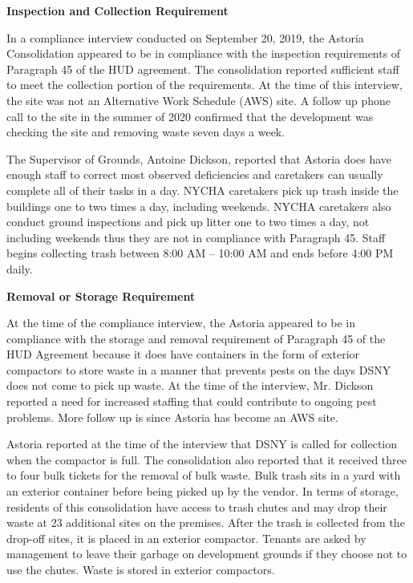
\textbf{Inspection and Collection Requirement}

In a compliance interview conducted on September 20, 2019, the Astoria Consolidation appeared to be in compliance with the inspection requirements of Paragraph 45 of the HUD agreement. The consolidation reported sufficient staff to meet the collection portion of the requirements. At the time of this interview, the site was not an Alternative Work Schedule (AWS) site. A follow up phone call to the site in the summer of 2020 confirmed that the development was checking the site and removing waste seven days a week.

The Supervisor of Grounds, Antoine Dickson, reported that Astoria does have enough staff to correct most observed deficiencies and caretakers can usually complete all of their tasks in a day. NYCHA caretakers pick up trash inside the buildings one to two times a day, including weekends. NYCHA caretakers also conduct ground inspections and pick up litter one to two times a day, not including weekends thus they are not in compliance with Paragraph 45. Staff begins collecting trash between 8:00 AM -- 10:00 AM and ends before 4:00 PM daily.

\textbf{Removal or Storage Requirement}

At the time of the compliance interview, the Astoria appeared to be in compliance with the storage and removal requirement of Paragraph 45 of the HUD Agreement because it does have containers in the form of exterior compactors to store waste in a manner that prevents pests on the days DSNY does not come to pick up waste. At the time of the interview, Mr. Dickson reported a need for increased staffing that could contribute to ongoing pest problems. More follow up is since Astoria has become an AWS site.

Astoria reported at the time of the interview that DSNY is called for collection when the compactor is full. The consolidation also reported that it received three to four bulk tickets for the removal of bulk waste. Bulk trash sits in a yard with an exterior container before being picked up by the vendor. In terms of storage, residents of this consolidation have access to trash chutes and may drop their waste at 23 additional sites on the premises. After the trash is collected from the drop-off sites, it is placed in an exterior compactor. Tenants are asked by management to leave their garbage on development grounds if they choose not to use the chutes. Waste is stored in exterior compactors. 

